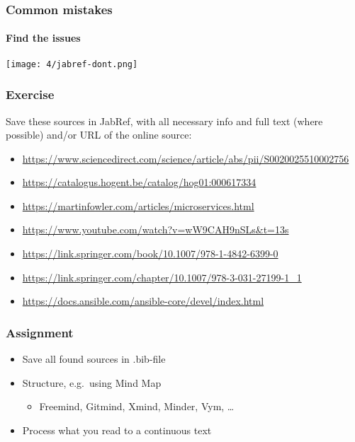 \documentclass[aspectratio=169]{beamer}
\begin{document}
\begin{frame}
	\frametitle{Common mistakes}
	\framesubtitle{Find the issues}
	
	\centering
	\texttt{[image: 4/jabref-dont.png]}
	
	
\end{frame}

\begin{frame}[plain]
  \frametitle{Exercise}

  Save these sources in JabRef, with all necessary info and full text (where possible) and/or URL of the online source:

  \bigskip

  \begin{itemize}
    \item \url{https://www.sciencedirect.com/science/article/abs/pii/S0020025510002756}
    \item \url{https://catalogus.hogent.be/catalog/hog01:000617334}
    \item \url{https://martinfowler.com/articles/microservices.html}
    \item \url{https://www.youtube.com/watch?v=wW9CAH9nSLs&t=13s}
    \item \url{https://link.springer.com/book/10.1007/978-1-4842-6399-0}
    \item \url{https://link.springer.com/chapter/10.1007/978-3-031-27199-1_1}
    \item \url{https://docs.ansible.com/ansible-core/devel/index.html}
  \end{itemize}

\end{frame}

\begin{frame}
  \frametitle{Assignment}

  \begin{itemize}
    \item Save all found sources in .bib-file
    \item Structure, e.g.\ using Mind Map
          \begin{itemize}
            \item Freemind, Gitmind, Xmind, Minder, Vym, \ldots
          \end{itemize}
    \item Process what you read to a continuous text
  \end{itemize}

  \bigskip

\end{frame}
\end{document}
